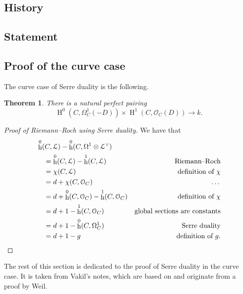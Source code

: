 \documentclass[10pt,a4paper]{article}
\theoremstyle{lecture}
\newtheorem{theorem}{Theorem}
\DeclareMathOperator\hh{h}
\DeclareMathOperator\HH{H}
\begin{document}
\subsection{History}
\label{subsection-serre-duality-history}

\subsection{Statement}
\label{subsection:serre-duality-statement}

\subsection{Proof of the curve case}
\label{subsection:serre-duality-curves}
The curve case of Serre duality is the following.
\begin{theorem}
  \label{theorem:serre-duality-curves}
  There is a natural perfect pairing
  \begin{equation}
    \HH^0(C,\Omega_C^1(-D))\times\HH^1(C,\mathcal{O}_C(D))\to k.
  \end{equation}
\end{theorem}

\begin{proof}[Proof of Riemann--Roch using Serre duality]
  We have that
  \begin{equation}
    \begin{aligned}
      &\hh^0(C,\mathcal{L})-\hh^0(C,\Omega^1\otimes\mathcal{L}^\vee) \\
      &\quad=\hh^0(C,\mathcal{L})-\hh^1(C,\mathcal{L}) & \text{Riemann--Roch} \\
      &\quad=\chi(C,\mathcal{L}) & \text{definition of~$\chi$} \\
      &\quad=d+\chi(C,\mathcal{O}_C) & \text{\dots} \\
      &\quad=d+\hh^0(C,\mathcal{O}_C)-\hh^1(C,\mathcal{O}_C) & \text{definition of~$\chi$} \\
      &\quad=d+1-\hh^1(C,\mathcal{O}_C) & \text{global sections are constants} \\
      &\quad=d+1-\hh^0(C,\Omega_C^1) & \text{Serre duality} \\
      &\quad=d+1-g & \text{definition of $g$}.
    \end{aligned}
  \end{equation}
\end{proof}

The rest of this section is dedicated to the proof of Serre duality in the curve case. It is taken from Vakil's notes, which are based on \cite{serre-groupes-algebriques-et-corps-de-classes} and originate from a proof by Weil.
\end{document}
